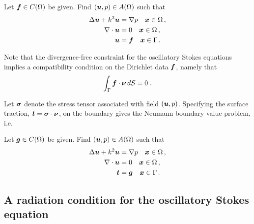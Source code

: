 \begin{definition}
  Let ${\boldsymbol f} \in C(\Omega)$ be given. Find $({\boldsymbol u},p) \in A(\Omega)$
  such that
  \begin{equation}
  \begin{aligned} \label{eq:dir_interior}
    \Delta {\boldsymbol u} + k^{2} {\boldsymbol u} &= \nabla p \quad {\boldsymbol x} \in \Omega \, ,\\
    \nabla \cdot {\boldsymbol u} &= 0 \quad {\boldsymbol x} \in \Omega \, ,  \\
    {\boldsymbol u} &= {\boldsymbol f} \quad {\boldsymbol x} \in \Gamma \, .
  \end{aligned}
  \end{equation}
\end{definition}
Note that the divergence-free constraint for the oscillatory
Stokes equations implies a compatibility condition on the
Dirichlet data ${\boldsymbol f}$, namely that
\begin{equation} \label{eq:dir_compat}
  \int_\Gamma {\boldsymbol f} \cdot {\boldsymbol \nu} \, dS = 0 \; .
\end{equation}


Let ${\boldsymbol \sigma}$ denote the stress tensor associated with
field $({\boldsymbol u},p)$. 
Specifying the surface traction, ${\boldsymbol t} = {\boldsymbol \sigma} \cdot {\boldsymbol \nu}$,
on the boundary gives the Neumann boundary value
problem, i.e.

\begin{definition}
  Let ${\boldsymbol g} \in C(\Omega)$ be given. Find $({\boldsymbol u},p) \in A(\Omega)$
  such that
  \begin{equation}
  \begin{aligned} \label{eq:neu_interior}
    \Delta {\boldsymbol u} + k^{2} {\boldsymbol u} &= \nabla p \quad {\boldsymbol x} \in \Omega \, ,\\
    \nabla \cdot {\boldsymbol u} &= 0 \quad {\boldsymbol x} \in \Omega \, ,  \\
    {\boldsymbol t} &= {\boldsymbol g} \quad {\boldsymbol x} \in \Gamma \, .
  \end{aligned}
  \end{equation}
\end{definition}

\subsection{A radiation condition for the oscillatory Stokes
  equation}

